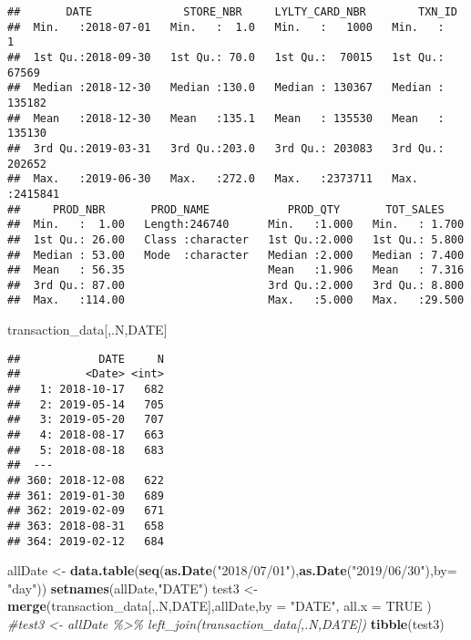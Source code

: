 \documentclass[
]{article}
\newenvironment{Shaded}{\begin{snugshade}}{\end{snugshade}}
\newcommand{\AttributeTok}[1]{\textcolor[rgb]{0.13,0.29,0.53}{#1}}
\newcommand{\CommentTok}[1]{\textcolor[rgb]{0.56,0.35,0.01}{\textit{#1}}}
\newcommand{\ConstantTok}[1]{\textcolor[rgb]{0.56,0.35,0.01}{#1}}
\newcommand{\FunctionTok}[1]{\textcolor[rgb]{0.13,0.29,0.53}{\textbf{#1}}}
\newcommand{\NormalTok}[1]{#1}
\newcommand{\OtherTok}[1]{\textcolor[rgb]{0.56,0.35,0.01}{#1}}
\newcommand{\StringTok}[1]{\textcolor[rgb]{0.31,0.60,0.02}{#1}}
\begin{document}
\begin{verbatim}
##       DATE              STORE_NBR     LYLTY_CARD_NBR        TXN_ID       
##  Min.   :2018-07-01   Min.   :  1.0   Min.   :   1000   Min.   :      1  
##  1st Qu.:2018-09-30   1st Qu.: 70.0   1st Qu.:  70015   1st Qu.:  67569  
##  Median :2018-12-30   Median :130.0   Median : 130367   Median : 135182  
##  Mean   :2018-12-30   Mean   :135.1   Mean   : 135530   Mean   : 135130  
##  3rd Qu.:2019-03-31   3rd Qu.:203.0   3rd Qu.: 203083   3rd Qu.: 202652  
##  Max.   :2019-06-30   Max.   :272.0   Max.   :2373711   Max.   :2415841  
##     PROD_NBR       PROD_NAME            PROD_QTY       TOT_SALES     
##  Min.   :  1.00   Length:246740      Min.   :1.000   Min.   : 1.700  
##  1st Qu.: 26.00   Class :character   1st Qu.:2.000   1st Qu.: 5.800  
##  Median : 53.00   Mode  :character   Median :2.000   Median : 7.400  
##  Mean   : 56.35                      Mean   :1.906   Mean   : 7.316  
##  3rd Qu.: 87.00                      3rd Qu.:2.000   3rd Qu.: 8.800  
##  Max.   :114.00                      Max.   :5.000   Max.   :29.500
\end{verbatim}

\begin{Shaded}
\begin{Highlighting}[]
\NormalTok{transaction\_data[,.N,DATE]}
\end{Highlighting}
\end{Shaded}

\begin{verbatim}
##            DATE     N
##          <Date> <int>
##   1: 2018-10-17   682
##   2: 2019-05-14   705
##   3: 2019-05-20   707
##   4: 2018-08-17   663
##   5: 2018-08-18   683
##  ---                 
## 360: 2018-12-08   622
## 361: 2019-01-30   689
## 362: 2019-02-09   671
## 363: 2018-08-31   658
## 364: 2019-02-12   684
\end{verbatim}

\begin{Shaded}
\begin{Highlighting}[]
\NormalTok{allDate }\OtherTok{\textless{}{-}} \FunctionTok{data.table}\NormalTok{(}\FunctionTok{seq}\NormalTok{(}\FunctionTok{as.Date}\NormalTok{(}\StringTok{"2018/07/01"}\NormalTok{),}\FunctionTok{as.Date}\NormalTok{(}\StringTok{"2019/06/30"}\NormalTok{),}\AttributeTok{by=} \StringTok{"day"}\NormalTok{))}
\FunctionTok{setnames}\NormalTok{(allDate,}\StringTok{"DATE"}\NormalTok{)}
\NormalTok{test3 }\OtherTok{\textless{}{-}} \FunctionTok{merge}\NormalTok{(transaction\_data[,.N,DATE],allDate,}\AttributeTok{by =} \StringTok{"DATE"}\NormalTok{, }\AttributeTok{all.x =} \ConstantTok{TRUE}\NormalTok{ )}
\CommentTok{\#test3 \textless{}{-} allDate \%\textgreater{}\% left\_join(transaction\_data[,.N,DATE])}
\FunctionTok{tibble}\NormalTok{(test3)}
\end{Highlighting}
\end{Shaded}
\end{document}
